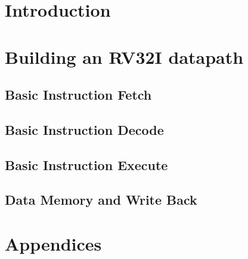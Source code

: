 \documentclass[a4paper]{book}
\begin{document}
\frontmatter
\maketitle
\tableofcontents
\let\cleardoublepage\clearpage
\mainmatter
\chapter{Introduction}


\chapter{Building an RV32I datapath}
\section{Basic Instruction Fetch}


\section{Basic Instruction Decode}

\newpage

\section{Basic Instruction Execute}


\section{Data Memory and Write Back}

\let\cleardoublepage\clearpage

\chapter{Appendices}

 

\end{document}
